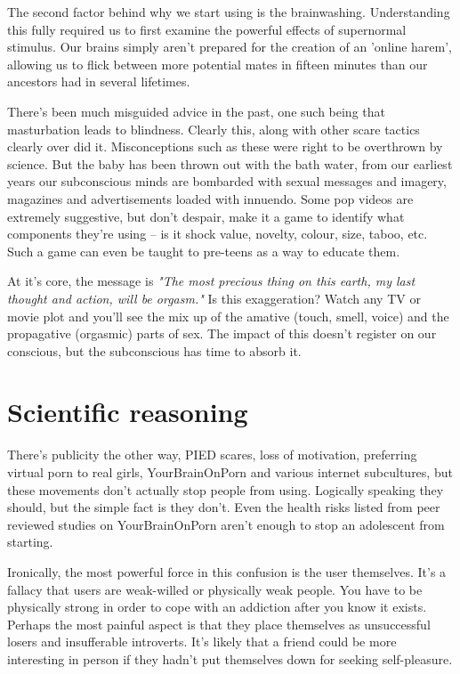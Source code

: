 \documentclass[easypeasy.tex]{subfiles}
\begin{document}
The second factor behind why we start using is the brainwashing. Understanding this fully required us to first examine the powerful effects of supernormal stimulus. Our brains simply aren't prepared for the creation of an 'online harem', allowing us to flick between more potential mates in fifteen minutes than our ancestors had in several lifetimes.

There's been much misguided advice in the past, one such being that masturbation leads to blindness. Clearly this, along with other scare tactics clearly over did it. Misconceptions such as these were right to be overthrown by science. But the baby has been thrown out with the bath water, from our earliest years our subconscious minds are bombarded with sexual messages and imagery, magazines and advertisements loaded with innuendo. Some pop videos are extremely suggestive, but don't despair, make it a game to identify what components they're using -- is it shock value, novelty, colour, size, taboo, etc. Such a game can even be taught to pre-teens as a way to educate them.

At it's core, the message is \textit{"The most precious thing on this earth, my last thought and action, will be orgasm."} Is this exaggeration? Watch any TV or movie plot and you'll see the mix up of the amative (touch, smell, voice) and the propagative (orgasmic) parts of sex. The impact of this doesn't register on our conscious, but the subconscious has time to absorb it.

\section{Scientific reasoning}
There's publicity the other way, PIED scares, loss of motivation, preferring virtual porn to real girls, YourBrainOnPorn and various internet subcultures, but these movements don't actually stop people from using. Logically speaking they should, but the simple fact is they don't. Even the health risks listed from peer reviewed studies on YourBrainOnPorn aren't enough to stop an adolescent from starting.

Ironically, the most powerful force in this confusion is the user themselves. It's a fallacy that users are weak-willed or physically weak people. You have to be physically strong in order to cope with an addiction after you know it exists. Perhaps the most painful aspect is that they place themselves as unsuccessful losers and insufferable introverts. It's likely that a friend could be more interesting in person if they hadn't put themselves down for seeking self-pleasure.
\end{document}
